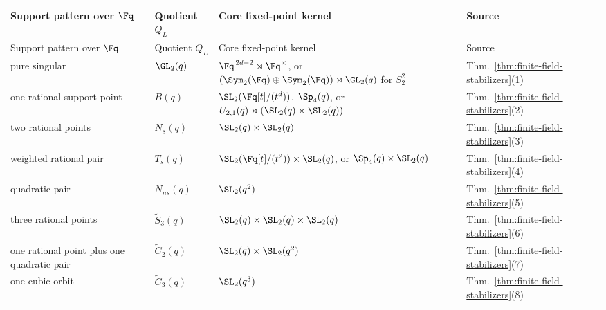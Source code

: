 \begin{center}
\footnotesize
\setlength{\tabcolsep}{3pt}
\begin{longtable}{@{}L{0.25\textwidth} L{0.20\textwidth} L{0.37\textwidth} L{0.12\textwidth}@{}}
\toprule
Support pattern over \(\Fq\) & Quotient \(Q_L\) & Core fixed-point kernel & Source \\
\midrule
\endfirsthead
\toprule
Support pattern over \(\Fq\) & Quotient \(Q_L\) & Core fixed-point kernel & Source \\
\midrule
\endhead
\bottomrule
\endlastfoot
pure singular &
\(\GL_2(q)\) &
\(\Fq^{\,2d-2}\rtimes \Fq^\times\), or
\((\Sym_2(\Fq)\oplus \Sym_2(\Fq))\rtimes \GL_2(q)\) for \(S_2^2\) &
Thm.~\ref{thm:finite-field-stabilizers}(1) \\
one rational support point &
\(B(q)\) &
\(\SL_2(\Fq[t]/(t^d))\), \(\Sp_4(q)\), or
\(U_{2,1}(q)\rtimes (\SL_2(q)\times \SL_2(q))\) &
Thm.~\ref{thm:finite-field-stabilizers}(2) \\
two rational points &
\(N_s(q)\) &
\(\SL_2(q)\times \SL_2(q)\) &
Thm.~\ref{thm:finite-field-stabilizers}(3) \\
weighted rational pair &
\(T_s(q)\) &
\(\SL_2(\Fq[t]/(t^2))\times \SL_2(q)\), or
\(\Sp_4(q)\times \SL_2(q)\) &
Thm.~\ref{thm:finite-field-stabilizers}(4) \\
quadratic pair &
\(N_{ns}(q)\) &
\(\SL_2(q^2)\) &
Thm.~\ref{thm:finite-field-stabilizers}(5) \\
three rational points &
\(\widetilde{S}_3(q)\) &
\(\SL_2(q)\times \SL_2(q)\times \SL_2(q)\) &
Thm.~\ref{thm:finite-field-stabilizers}(6) \\
one rational point plus one quadratic pair &
\(\widetilde{C}_2(q)\) &
\(\SL_2(q)\times \SL_2(q^2)\) &
Thm.~\ref{thm:finite-field-stabilizers}(7) \\
one cubic orbit &
\(\widetilde{C}_3(q)\) &
\(\SL_2(q^3)\) &
Thm.~\ref{thm:finite-field-stabilizers}(8) \\
\end{longtable}
\setlength{\tabcolsep}{6pt}
\end{center}
